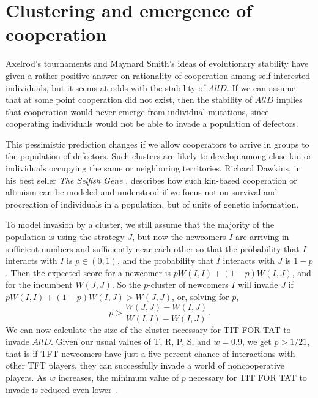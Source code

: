 \section{Clustering and emergence of cooperation}
Axelrod's tournaments and Maynard Smith's ideas of evolutionary stability have given a rather positive answer on rationality of cooperation among self-interested individuals, but it seems at odds with the stability of $AllD$. If we can assume that at some point cooperation did not exist, then the stability of $AllD$ implies that cooperation would never emerge from individual mutations, since cooperating individuals would not be able to invade a population of defectors.

This pessimistic prediction changes if we allow cooperators to arrive in groups to the population of defectors. Such clusters are likely to develop among close kin or individuals occupying the same or neighboring territories. Richard Dawkins, in his best seller \textit{The Selfish Gene} \cite{dawkins2006selfish}, describes how such kin-based cooperation or altruism can be modeled and understood if we focus not on survival and procreation of individuals in a population, but of units of genetic information.

To model invasion by a cluster, we still assume that the majority of the population is using the strategy $J$, but now the newcomers $I$ are arriving in sufficient numbers and sufficiently near each other so that the probability that $I$ interacts with $I$ is $p \in (0, 1)$, and the probability that $I$ interacts with $J$ is $1-p$. Then the expected score for a newcomer is $pW(I, I) + (1-p) W(I, J)$, and for the incumbent $W(J, J)$. So the $p$-cluster of newcomers $I$ will invade $J$ if $pW(I, I) + (1-p) W(I, J) > W(J, J)$, or, solving for $p$,
\[
p > \frac{W(J, J) - W(I, J)}{W(I, I) - W(I, J)}.
\]
We can now calculate the size of the cluster necessary for TIT FOR TAT to invade $AllD$. Given our usual values of T, R, P, S, and $w = 0.9$, we get $p > 1/21$, that is if TFT newcomers have just a five percent chance of interactions with other TFT players, they can successfully invade a world of noncooperative players. As $w$ increases, the minimum value of $p$ necessary for TIT FOR TAT to invade is reduced even lower~\cite{RobertAxelrod_1981}.

